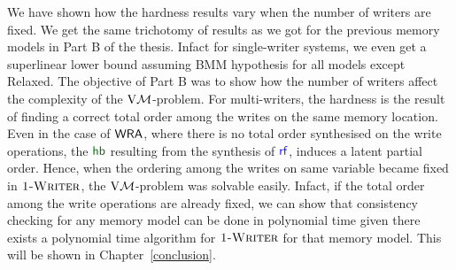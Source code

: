 We have shown how the hardness results vary when the number of writers are fixed. We get the same trichotomy of results as we got for the previous memory models in Part B of the thesis. Infact for single-writer systems, we even get a superlinear lower bound assuming BMM hypothesis for all models except Relaxed. The objective of Part B was to show how the number of writers affect the complexity of the $\mathrm{V}\mathcal{M}$-problem. For multi-writers, the hardness  is the result of finding a correct total order among the writes on the same memory location. Even in the case of $\mathsf{WRA}$, where there is no total order synthesised on the write operations, the $\hb$ resulting from the synthesis of $\rf$, induces a latent partial order.  
 Hence, when the ordering among the writes on same variable became fixed in $\textsc{1-Writer}$, the $\mathrm{V}\mathcal{M}$-problem was solvable easily. Infact, if the total order among the write operations are already fixed, we can show that consistency checking for any memory model can be done in polynomial time given there exists a polynomial time algorithm for $\textsc{1-Writer}$ for that memory model. This will be shown in Chapter~\ref{conclusion}.  
